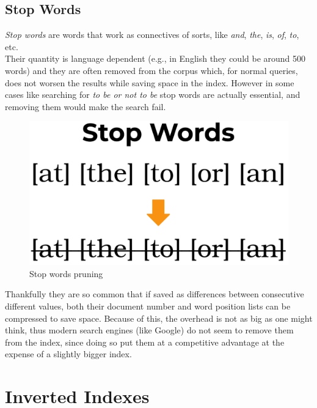 \subsection{Stop Words}

\textit{Stop words} are words that work as connectives of sorts, like \textit{and}, \textit{the}, \textit{is}, \textit{of}, \textit{to}, etc. \\
Their quantity is language dependent (e.g., in English they could be around 500 words) and they are often removed from the corpus which, for normal queries, does not worsen the results while saving space in the index. However in some cases like searching for \textit{to be or not to be} stop words are actually essential, and removing them would make the search fail. \\ 

\begin{figure} %
    \centering
    \includegraphics[width=.4\textwidth]{imgs/stopwords.png}
    \caption{Stop words pruning\label{fig:stopwords}}
\end{figure}

Thankfully they are so common that if saved as differences between consecutive different values, both their document number and word position lists can be compressed to save space. Because of this, the overhead is not as big as one might think, thus modern search engines (like Google) do not seem to remove them from the index, since doing so put them at a competitive advantage at the expense of a slightly bigger index. \\ 

\section{Inverted Indexes}

